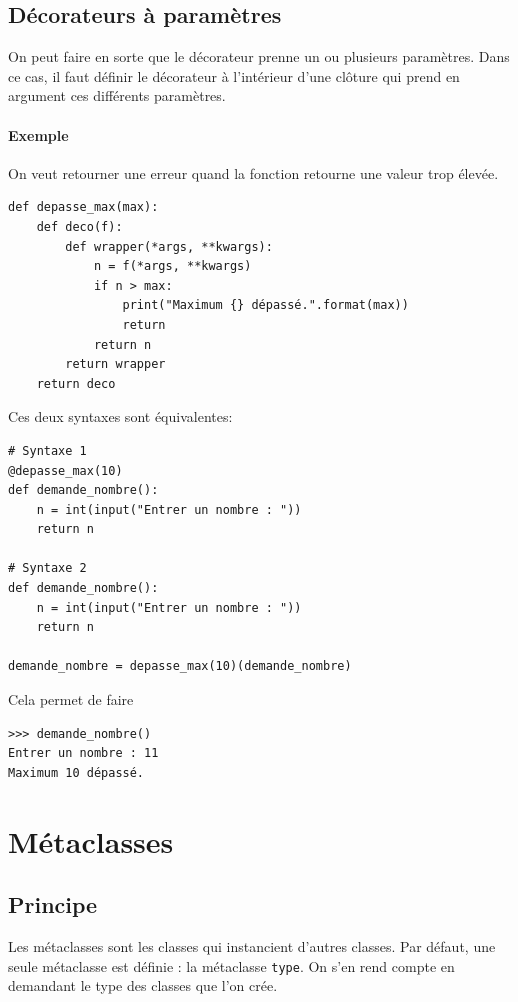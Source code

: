 \documentclass[a4paper, 10pt]{article}
\begin{document}
\subsection{Décorateurs à paramètres}
On peut faire en sorte que le décorateur prenne un ou plusieurs paramètres. Dans ce cas, il faut définir le décorateur à l'intérieur d'une clôture qui prend en argument ces différents paramètres.

\paragraph{Exemple} On veut retourner une erreur quand la fonction retourne une valeur trop élevée.
\begin{verbatim}
def depasse_max(max):
    def deco(f):
        def wrapper(*args, **kwargs):
            n = f(*args, **kwargs)
            if n > max:
                print("Maximum {} dépassé.".format(max))
                return
            return n
        return wrapper
    return deco
\end{verbatim}

Ces deux syntaxes sont équivalentes:

\begin{verbatim}
# Syntaxe 1
@depasse_max(10)
def demande_nombre():
    n = int(input("Entrer un nombre : "))
    return n

# Syntaxe 2
def demande_nombre():
    n = int(input("Entrer un nombre : "))
    return n

demande_nombre = depasse_max(10)(demande_nombre)
\end{verbatim}

Cela permet de faire

\begin{Verbatim}[frame=single, fontsize=\footnotesize]
>>> demande_nombre()
Entrer un nombre : 11
Maximum 10 dépassé.
\end{Verbatim}

\section{Métaclasses}
\subsection{Principe}
\label{sec:metaclasses}
Les métaclasses sont les classes qui instancient d'autres classes. Par défaut, une seule métaclasse est définie : la métaclasse \texttt{type}. On s'en rend compte en demandant le type des classes que l'on crée.
\end{document}

